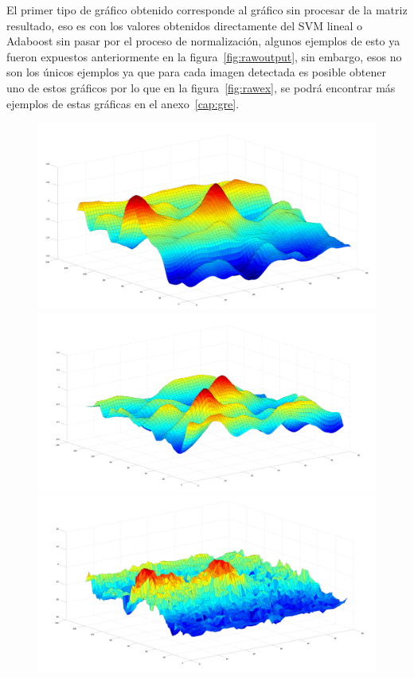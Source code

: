 El primer tipo de gráfico obtenido corresponde al gráfico sin procesar de la matriz resultado, eso es con los valores obtenidos directamente del SVM lineal o Adaboost sin pasar por el proceso de normalización, algunos ejemplos de esto ya fueron expuestos anteriormente en la figura~\ref{fig:rawoutput}, sin embargo, esos no son los únicos ejemplos ya que para cada imagen detectada  es posible obtener uno de estos gráficos por lo que en la figura~\ref{fig:rawex}, se podrá encontrar más ejemplos de estas gráficas en el anexo~\ref{cap:gre}.

\begin{figure}[htc]
  \centering
  \includegraphics[scale=.1]{images/raw/1}
  \includegraphics[scale=.1]{images/raw/2}
  \includegraphics[scale=.1]{images/raw/3}

\end{figure}
